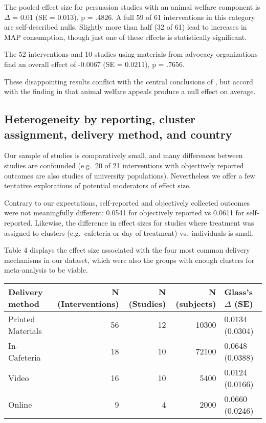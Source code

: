\documentclass[sn-nature,pdflatex]{sn-jnl}
\begin{document}
The pooled effect size for persuasion studies with an animal welfare
component is \(\Delta\) = 0.01 (SE = 0.013), p = .4826. A full 59 of 61
interventions in this category are self-described nulls. Slightly more
than half (32 of 61) lead to increases in MAP consumption, though just
one of these effects is statistically significant.

The 52 interventions and 10 studies using materials from advocacy
organizations find an overall effect of -0.0067 (SE = 0.0211), p =
.7656.

These disappointing results conflict with the central conclusions of
\citep{mathur2021effectiveness}, but accord with the finding in
\citep{DiGennaro2024} that animal welfare appeals produce a null effect
on average.

\subsection{Heterogeneity by reporting, cluster assignment, delivery
method, and country}\label{sec2.10}

Our sample of studies is comparatively small, and many differences
between studies are confounded (e.g.~20 of 21 interventions with
objectively reported outcomes are also studies of university
populations). Nevertheless we offer a few tentative explorations of
potential moderators of effect size.

Contrary to our expectations, self-reported and objectively collected
outcomes were not meaningfully different: 0.0541 for objectively
reported vs 0.0611 for self-reported. Likewise, the difference in effect
sizes for studies where treatment was assigned to clusters
(e.g.~cafeteria or day of treatment) vs.~individuals is small.

Table 4 displays the effect size associated with the four most common
delivery mechanisms in our dataset, which were also the groups with
enough clusters for meta-analysis to be viable.

\begin{table}[!h]
\centering
\begin{tabular}{lrrrl}
\toprule
Delivery method & N (Interventions) & N (Studies) & N (subjects) & Glass's $\Delta$ (SE)\\
\midrule
Printed Materials & 56 & 12 & 10300 & 0.0134 (0.0304)\\
In-Cafeteria & 18 & 10 & 72100 & 0.0648 (0.0388)\\
Video & 16 & 10 & 5400 & 0.0124 (0.0166)\\
Online & 9 & 4 & 2000 & 0.0660 (0.0246)\\
\bottomrule
\end{tabular}
\end{table}
\end{document}
